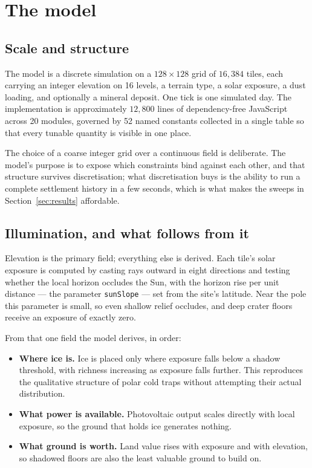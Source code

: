 \section{The model}
\label{sec:model}

\subsection{Scale and structure}

The model is a discrete simulation on a $128\times128$ grid of $16{,}384$
tiles, each carrying an integer elevation on 16 levels, a terrain type, a solar
exposure, a dust loading, and optionally a mineral deposit. One tick is one
simulated day. The implementation is approximately $12{,}800$ lines of
dependency-free JavaScript across 20 modules, governed by 52 named constants
collected in a single table so that every tunable quantity is visible in one
place.

The choice of a coarse integer grid over a continuous field is deliberate. The
model's purpose is to expose which constraints bind against each other, and
that structure survives discretisation; what discretisation buys is the ability
to run a complete settlement history in a few seconds, which is what makes the
sweeps in Section~\ref{sec:results} affordable.

\subsection{Illumination, and what follows from it}

Elevation is the primary field; everything else is derived. Each tile's solar
exposure is computed by casting rays outward in eight directions and testing
whether the local horizon occludes the Sun, with the horizon rise per unit
distance --- the parameter \texttt{sunSlope} --- set from the site's latitude.
Near the pole this parameter is small, so even shallow relief occludes, and
deep crater floors receive an exposure of exactly zero.

From that one field the model derives, in order:

\begin{itemize}
\item \textbf{Where ice is.} Ice is placed only where exposure falls below a
  shadow threshold, with richness increasing as exposure falls further. This
  reproduces the qualitative structure of polar cold traps
  \citep{paige2010diviner} without attempting their actual distribution.
\item \textbf{What power is available.} Photovoltaic output scales directly
  with local exposure, so the ground that holds ice generates nothing.
\item \textbf{What ground is worth.} Land value rises with exposure and with
  elevation, so shadowed floors are also the least valuable ground to build
  on.
\end{itemize}

